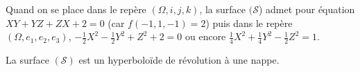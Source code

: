 {\begin{enumerate}
{Quand on se place dans le repère $(\Omega,i,j,k)$, la surface $(\mathcal{S}$) admet pour équation $XY+YZ+ZX +2 = 0$ (car $f(-1,1,-1)=2$) puis dans le repère $(\Omega,e_1,e_2,e_3)$, $-\frac{1}{2}X^2-\frac{1}{2}Y^2+Z^2 +2 = 0$ ou encore $\frac{1}{4}X^2+\frac{1}{4}Y^2-\frac{1}{2}Z^2=1$.

La surface $(\mathcal{S})$ est un hyperboloïde de révolution à une nappe.}
\end{enumerate}
}

